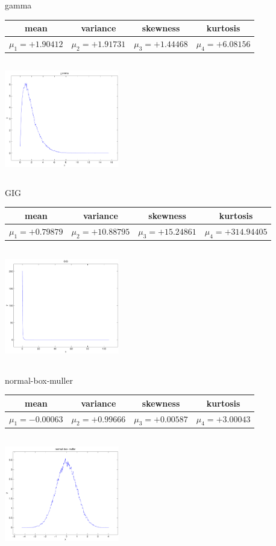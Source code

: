 \documentclass[9pt]{article}
\theoremstyle{plain}
\theoremstyle{definition}
\theoremstyle{remark}
\numberwithin{equation}{section}
\begin{document}
\newpage
gamma \begin{tabular}{|c|c|c|c|}  mean & variance & skewness & kurtosis \\  \hline
$\mu_1 = +1.90412$ & $\mu_2 = +1.91731$ & $\mu_3 = +1.44468$ & $\mu_4 =+6.08156$ \\
\end{tabular}

\includegraphics[width=5cm,height=5cm]{gamma.pdf}

GIG \begin{tabular}{|c|c|c|c|}  mean & variance & skewness & kurtosis \\  \hline
$\mu_1 = +0.79879$ & $\mu_2 = +10.88795$ & $\mu_3 = +15.24861$ & $\mu_4 =+314.94405$ \\
\end{tabular}

\includegraphics[width=5cm,height=5cm]{GIG.pdf}

normal-box-muller \begin{tabular}{|c|c|c|c|}  mean & variance & skewness & kurtosis \\  \hline
$\mu_1 = -0.00063$ & $\mu_2 = +0.99666$ & $\mu_3 = +0.00587$ & $\mu_4 =+3.00043$ \\
\end{tabular}

\includegraphics[width=5cm,height=5cm]{normal-box-muller.pdf}
\end{document}
